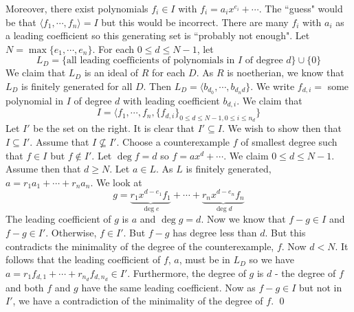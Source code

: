 Moreover, there exist polynomials $f_i \in I$ with $f_i=a_ix^{e_i}+\cdots$. The ``guess" would be that $\langle f_1,\cdots,f_n \rangle=I$ but this would be incorrect. There are many $f_i$ with $a_i$ as a leading coefficient so this generating set is ``probably not enough". Let $N=\max \{e_1,\cdots,e_n\}$. For each $0 \leq d \leq N-1$, let
\[
L_D=\{\text{all leading coefficients of polynomials in } I \text{ of degree }d\} \cup\{0\}
\]
We claim that $L_D$ is an ideal of $R$ for each $D$. As $R$ is noetherian, we know that $L_D$ is finitely generated for all $D$. Then $L_D=\langle b_{d_0},\cdots,b_{d_nd}\}$. We write $f_{d,i}=$ some polynomial in $I$ of degree $d$ with leading coefficient $b_{d,i}$. We claim that 
\[
I=\langle f_1,\cdots,f_n,\{f_{d,i}\}_{0 \leq d \leq N-1,0 \leq i \leq n_d}\}
\]
Let $I'$ be the set on the right. It is clear that $I' \subseteq I$. We wish to show then that $I \subseteq I'$. Assume that $I \not\subseteq I'$. Choose a counterexample $f$ of smallest degree such that $f \in I$ but $f \notin I'$. Let $\deg f=d$ so $f=ax^d+\cdots$. We claim $0 \leq d \leq N-1$. Assume then that $d \geq N$. Let $a \in L$. As $L$ is finitely generated, $a=r_1a_1+\cdots+r_na_n$. We look at
\[
g=\underbrace{r_1 x^{d-e_1}f_1}_{\deg e}+\cdots+\underbrace{r_n x^{d-e_n}f_n}_{\deg d}
\]
The leading coefficient of $g$ is $a$ and $\deg g=d$. Now we know that $f-g \in I$ and $f-g \in I'$. Otherwise, $f \in I'$. But $f-g$ has degree less than $d$. But this contradicts the minimality of the degree of the counterexample, $f$. Now $d<N$. It follows that the leading coefficient of $f$, $a$, must be in $L_D$ so we have $a=r_1f_{d,1}+\cdots+r_{n_d}f_{d,n_d} \in I'$. Furthermore, the degree of $g$ is $d$ - the degree of $f$ and both $f$ and $g$ have the same leading coefficient. Now as $f-g \in I$ but not in $I'$, we have a contradiction of the minimality of the degree of $f$. \qed \\










































